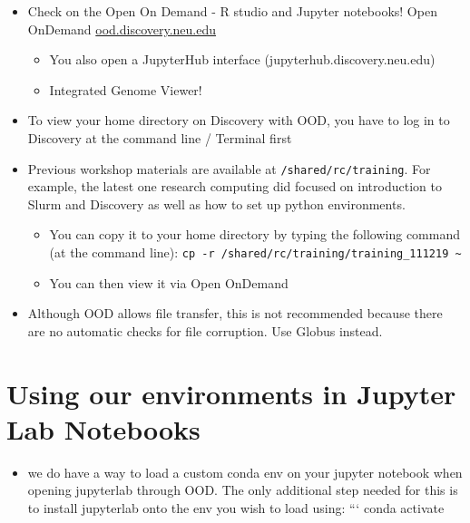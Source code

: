 \documentclass[
  letterpaper,
  DIV=11,
  numbers=noendperiod]{scrreprt}
\providecommand{\tightlist}{%
  \setlength{\itemsep}{0pt}\setlength{\parskip}{0pt}}\usepackage{longtable,booktabs,array}
\begin{document}
\begin{itemize}
\item
  Check on the Open On Demand - R studio and Jupyter notebooks! Open
  OnDemand
  \href{https://drk-lo.github.io/lotterhoslabprotocols/discovery_1a-OOD/ood.discovery.neu.edu}{ood.discovery.neu.edu}

  \begin{itemize}
  \item
    You also open a JupyterHub interface (jupyterhub.discovery.neu.edu)
  \item
    Integrated Genome Viewer!
  \end{itemize}
\item
  To view your home directory on Discovery with OOD, you have to log in
  to Discovery at the command line / Terminal first
\item
  Previous workshop materials are available at
  \texttt{/shared/rc/training}. For example, the latest one research
  computing did focused on introduction to Slurm and Discovery as well
  as how to set up python environments.

  \begin{itemize}
  \item
    You can copy it to your home directory by typing the following
    command (at the command line):
    \texttt{cp\ -r\ /shared/rc/training/training\_111219\ \textasciitilde{}}
  \item
    You can then view it via Open OnDemand
  \end{itemize}
\item
  Although OOD allows file transfer, this is not recommended because
  there are no automatic checks for file corruption. Use Globus instead.
\end{itemize}

\hypertarget{using-our-environments-in-jupyter-lab-notebooks}{%
\section*{\texorpdfstring{\textbf{Using our environments in Jupyter Lab
Notebooks}}{Using our environments in Jupyter Lab Notebooks}}\label{using-our-environments-in-jupyter-lab-notebooks}}


\begin{itemize}
\tightlist
\item
  we do have a way to load a custom conda env on your jupyter notebook
  when opening jupyterlab through OOD. The only additional step needed
  for this is to install jupyterlab onto the env you wish to load using:
  ``` conda activate
\end{itemize}
\end{document}
